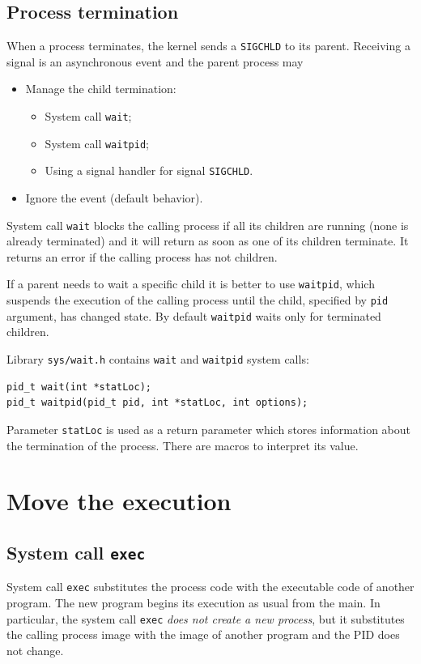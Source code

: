 \subsection{Process termination}
When a process terminates, the kernel sends a \texttt{SIGCHLD} to its parent. Receiving a signal is an asynchronous event and the parent process may
\begin{itemize}
\item Manage the child termination:
\begin{itemize}
\item System call \texttt{wait};
\item System call \texttt{waitpid};
\item Using a signal handler for signal \texttt{SIGCHLD}.
\end{itemize}
\item Ignore the event (default behavior).
\end{itemize}

System call \texttt{wait} blocks the calling process if all its children are running (none is already terminated) and it will return as soon as one of its children terminate. It returns an error if the calling process has not children.

If a parent needs to wait a specific child it is better to use \texttt{waitpid}, which suspends the execution of the calling process until the child, specified by \texttt{pid} argument, has changed state. By default \texttt{waitpid} waits only for terminated children.

Library \texttt{sys/wait.h} contains \texttt{wait} and \texttt{waitpid} system calls:
\begin{verbatim}
pid_t wait(int *statLoc);
pid_t waitpid(pid_t pid, int *statLoc, int options);
\end{verbatim}

Parameter \texttt{statLoc} is used as a return parameter which stores information about the termination of the process. There are macros to interpret its value.

\section{Move the execution}
\subsection{System call \texttt{exec}}
System call \texttt{exec} substitutes the process code with the executable code of another program. The new program begins its execution as usual from the main. In particular, the system call \texttt{exec} \textit{does not create a new process}, but it substitutes the calling process image with the image of another program and the PID does not change.

